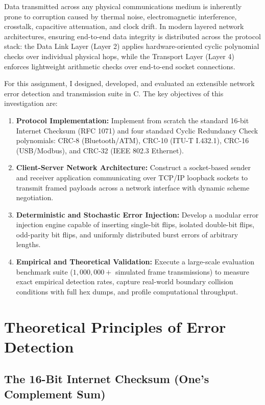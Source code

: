 \documentclass[11pt,a4paper]{article}
\begin{document}
Data transmitted across any physical communications medium is inherently prone to corruption caused by thermal noise, electromagnetic interference, crosstalk, capacitive attenuation, and clock drift. In modern layered network architectures, ensuring end-to-end data integrity is distributed across the protocol stack: the Data Link Layer (Layer 2) applies hardware-oriented cyclic polynomial checks over individual physical hops, while the Transport Layer (Layer 4) enforces lightweight arithmetic checks over end-to-end socket connections.

For this assignment, I designed, developed, and evaluated an extensible network error detection and transmission suite in C. The key objectives of this investigation are:

\begin{enumerate}
    \item \textbf{Protocol Implementation:} Implement from scratch the standard 16-bit Internet Checksum (RFC 1071) and four standard Cyclic Redundancy Check polynomials: CRC-8 (Bluetooth/ATM), CRC-10 (ITU-T I.432.1), CRC-16 (USB/Modbus), and CRC-32 (IEEE 802.3 Ethernet).
    \item \textbf{Client-Server Network Architecture:} Construct a socket-based sender and receiver application communicating over TCP/IP loopback sockets to transmit framed payloads across a network interface with dynamic scheme negotiation.
    \item \textbf{Deterministic and Stochastic Error Injection:} Develop a modular error injection engine capable of inserting single-bit flips, isolated double-bit flips, odd-parity bit flips, and uniformly distributed burst errors of arbitrary lengths.
    \item \textbf{Empirical and Theoretical Validation:} Execute a large-scale evaluation benchmark suite ($1{,}000{,}000+$ simulated frame transmissions) to measure exact empirical detection rates, capture real-world boundary collision conditions with full hex dumps, and profile computational throughput.
\end{enumerate}

\section{Theoretical Principles of Error Detection}

\subsection{The 16-Bit Internet Checksum (One's Complement Sum)}
\end{document}
